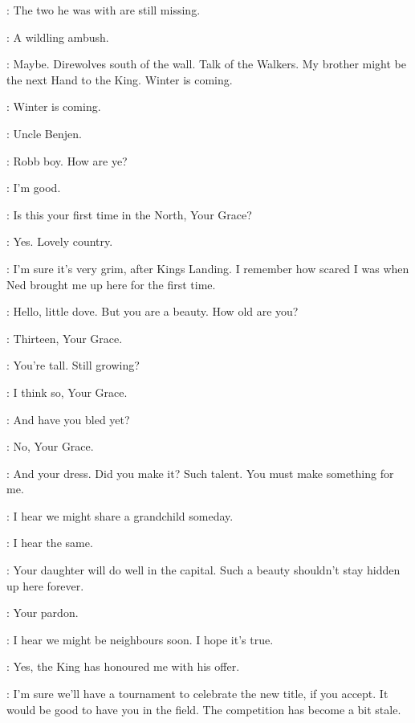 \BENJEN: The two he was with are still missing. 

\NED: A wildling ambush. 

\BENJEN: Maybe. Direwolves south of the wall. Talk of the Walkers. My brother might be the next Hand to the King. Winter is coming. 

\NED: Winter is coming. 


\ROBB: Uncle Benjen. 

\BENJEN: Robb boy. How are ye? 

\ROBB: I'm good. 


\CATELYN: Is this your first time in the North, Your Grace? 

\CERSEI: Yes. Lovely country. 

\CATELYN: I'm sure it's very grim, after Kings Landing. I remember how scared I was when Ned brought me up here for the first time. 


\CERSEI: Hello, little dove. But you are a beauty. How old are you? 

\SANSA: Thirteen, Your Grace. 

\CERSEI: You're tall. Still growing? 

\SANSA: I think so, Your Grace. 

\CERSEI: And have you bled yet? 

\SANSA: No, Your Grace. 

\CERSEI: And your dress. Did you make it? Such talent. You must make something for me. 


\CERSEI: I hear we might share a grandchild someday. 

\CATELYN: I hear the same. 

\CERSEI: Your daughter will do well in the capital. Such a beauty shouldn't stay hidden up here forever. 


\NED: Your pardon. 

\JAIME: I hear we might be neighbours soon. I hope it's true. 

\NED: Yes, the King has honoured me with his offer. 

\JAIME: I'm sure we'll have a tournament to celebrate the new title, if you accept. It would be good to have you in the field. The competition has become a bit stale. 


